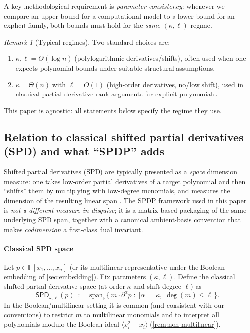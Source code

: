 \documentclass[12pt]{article}
\theoremstyle{definition}
\theoremstyle{remark}
\newtheorem{remark}[theorem]{Remark}
\begin{document}
A key methodological requirement is \emph{parameter consistency}: whenever we compare
an upper bound for a computational model to a lower bound for an explicit family, both
bounds must hold for the \emph{same} $(\kappa,\ell)$ regime.

\begin{remark}[Typical regimes]
Two standard choices are:
\begin{enumerate}[label=(\roman*),leftmargin=2.4em]
\item $\kappa,\ell = \Theta(\log n)$ (polylogarithmic derivatives/shifts), often used when
one expects polynomial bounds under suitable structural assumptions.
\item $\kappa = \Theta(n)$ with $\ell=O(1)$ (high-order derivatives, no/low shift), used in
classical partial-derivative rank arguments for explicit polynomials.
\end{enumerate}
This paper is agnostic: all statements below specify the regime they use.
\end{remark}

\subsection{Relation to classical shifted partial derivatives (SPD) and what ``SPDP'' adds}
\label{subsec:spdp-vs-spd}

Shifted partial derivatives (SPD) are typically presented as a \emph{space}
dimension measure: one takes low-order partial derivatives of a target
polynomial and then ``shifts'' them by multiplying with low-degree monomials,
and measures the dimension of the resulting linear span
\citep[e.g.][]{NW1997,SY2010}.
The SPDP framework used in this paper is \emph{not a different measure in disguise};
it is a matrix-based packaging of the same underlying SPD span, together with a
canonical ambient-basis convention that makes \emph{codimension} a first-class dual
invariant.

\paragraph{Classical SPD space}
Let $p \in \mathbb{F}[x_1,\dots,x_n]$ (or its multilinear representative under the
Boolean embedding of \ref{sec:embedding}). Fix parameters $(\kappa,\ell)$.
Define the classical shifted partial derivative space (at order $\kappa$ and shift degree $\ell$) as
\begin{equation}
\label{eq:spd-space}
\mathsf{SPD}_{\kappa,\ell}(p)
\;:=\;
\mathrm{span}_{\mathbb{F}}
\bigl\{\, m \cdot \partial^\alpha p \;:\; |\alpha|=\kappa,\; \deg(m)\le \ell \,\bigr\}.
\end{equation}
In the Boolean/multilinear setting it is common (and consistent with our conventions)
to restrict $m$ to multilinear monomials and to interpret all polynomials modulo the
Boolean ideal $\langle x_i^2-x_i\rangle$ (\ref{rem:non-multilinear}).
\end{document}
